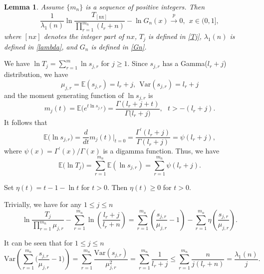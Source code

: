 \documentclass[11pt]{article}
\newtheorem{lemma}{\textbf{Lemma}}[section]
\numberwithin{equation}{section}
\def\Var{\mathrm{Var}}
\begin{document}
\begin{lemma}\label{Tnlimit}
    Assume $\{m_n\}$ is a sequence of positive integers. Then
    \begin{equation}\label{limit1}
    \frac{1}{\lambda_1(n)} \ln \frac{T_{[\mathrm{nx}]}}{\prod_{r=1}^{m_n}(l_r+n)}-\ln G_n(x) \stackrel{p}{\rightarrow} 0,~~ x \in
(0,1],
    \end{equation}
where $[nx]$ denotes the integer part of $nx$,  $T_j$ is defined in
\eqref{Tj}, $\lambda_1(n)$ is defined in \eqref{lambda}, and $G_n$
is defined in \eqref{Gn}.
\end{lemma}


 We have $\ln T_{j}=\sum_{r=1}^{m} \ln s_{j,
r}$ for $j \geq 1$. Since $s_{j,r}$ has a Gamma($l_r+j$)
distribution, we have
    \[
   \mu_{j, r}=\mathbb{E}\left(s_{j, r}\right)=l_{r}+j,~~{
\Var}\left(s_{j, r}\right)=l_{r}+j
    \]
and the moment generating function of $\ln s_{j, r}$ is
    \[
        m_{j}(t)=\mathbb{E}\big(e^{t \ln s_{j, r}}\big)=\frac{\Gamma\left(l_{r}+j+t\right)}{\Gamma\big(l_{r}+j\big)},~~~ t>-(l_r+j).
    \]
    It follows that
    \[
        \mathbb{E}\big(\ln s_{j, r}\big)=\frac{d}{d t} m_{j}(t)\Big|_{t=0}=\frac{\Gamma^{\prime}\left(l_{r}+j\right)}{\Gamma\left(l_{r}+j\right)}=\psi\left(l_{r}+j\right),
    \]
    where $\psi(x)=\Gamma^{\prime}(x) / \Gamma(x)$ is a digamma function.
    Thus, we have
    \begin{equation}\label{ElogT}
        \mathbb{E}\big(\ln T_{j}\big)=\sum_{r=1}^{m_n} \mathbb{E}\left(\ln s_{j, r}\right)=\sum_{r=1}^{m_n}
\psi\left(l_{r}+j\right).
    \end{equation}

Set $\eta(t)=t-1-\ln t$ for $t>0$.  Then $\eta(t)\ge 0$ for $t>0$.

Trivially, we have for any $1\le j\le n$
    \begin{equation}\label{logTj}
   \ln \frac{T_{j}}{\prod_{r=1}^{m_n}\mu_{j,r}}-\sum_{r=1}^{m_n}
\ln
(\frac{l_r+j}{l_r+n})=\sum_{r=1}^{m_n}(\frac{s_{j,r}}{\mu_{j,r}}-1)-\sum_{r=1}^{m_{n}}\eta(\frac{s_{j,r}}{\mu_{j,r}}).
    \end{equation}


It can be seen that for $1\le j\le n$
    \[
        {\Var}\left(\sum_{r=1}^{m_n}\Big(\frac{s_{j, r}}{\mu_{j, r}}-1\Big)\right)
        =\sum_{r=1}^{m_n} \frac{{\Var}\left(s_{j, r}\right)}{\mu_{j,
r}^{2}}=\sum_{r=1}^{m_n}\frac{1}{l_{r}+j}\le\sum_{r=1}^{m_n}\frac{n}{j(l_r+n)}=\frac{\lambda_1(n)}{j}.
    \]
\end{document}
